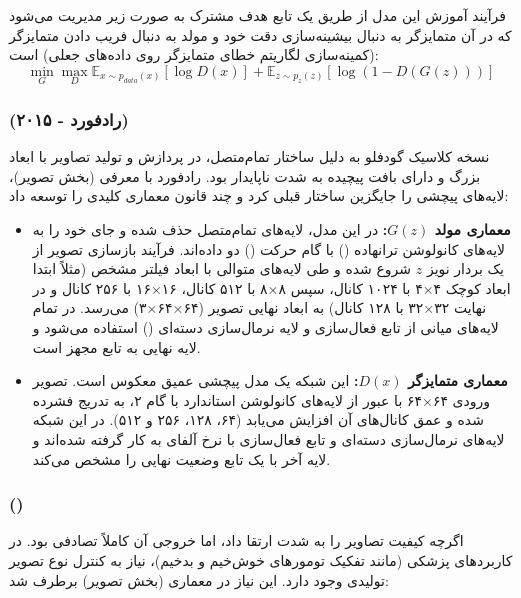 \documentclass{article}
\begin{document}
فرآیند آموزش این مدل از طریق یک تابع هدف مشترک به صورت زیر مدیریت می‌شود که در آن متمایزگر به دنبال بیشینه‌سازی دقت خود و مولد به دنبال فریب دادن متمایزگر (کمینه‌سازی لگاریتم خطای متمایزگر روی داده‌های جعلی) است:
$$\min_{G} \max_{D} \mathbb{E}_{x \sim p_{data}(x)}[\log D(x)] + \mathbb{E}_{z \sim p_z(z)}[\log (1 - D(G(z)))]$$

\subsubsection*{ (رادفورد - ۲۰۱۵)}
نسخه کلاسیک گودفلو به دلیل ساختار تمام‌متصل، در پردازش و تولید تصاویر با ابعاد بزرگ و دارای بافت پیچیده به شدت ناپایدار بود. رادفورد با معرفی  (بخش  تصویر)، لایه‌های پیچشی را جایگزین ساختار قبلی کرد و چند قانون معماری کلیدی را توسعه داد:

\begin{itemize}
	\item \textbf{معماری مولد $G(z)$:} در این مدل، لایه‌های تمام‌متصل حذف شده و جای خود را به لایه‌های کانولوشن ترانهاده () با گام حرکت () دو داده‌اند. فرآیند بازسازی تصویر از یک بردار نویز $z$ شروع شده و طی لایه‌های متوالی با ابعاد فیلتر مشخص (مثلاً ابتدا ابعاد کوچک ۴×۴ با ۱۰۲۴ کانال، سپس ۸×۸ با ۵۱۲ کانال، ۱۶×۱۶ با ۲۵۶ کانال و در نهایت ۳۲×۳۲ با ۱۲۸ کانال) به ابعاد نهایی تصویر (۶۴×۶۴×۳) می‌رسد. در تمام لایه‌های میانی از تابع فعال‌سازی  و لایه نرمال‌سازی دسته‌ای () استفاده می‌شود و لایه نهایی به تابع  مجهز است.
	\item \textbf{معماری متمایزگر $D(x)$:} این شبکه یک مدل پیچشی عمیق معکوس است. تصویر ورودی ۶۴×۶۴ با عبور از لایه‌های کانولوشن استاندارد با گام ۲، به تدریج فشرده شده و عمق کانال‌های آن افزایش می‌یابد (۶۴، ۱۲۸، ۲۵۶ و ۵۱۲). در این شبکه لایه‌های نرمال‌سازی دسته‌ای و تابع فعال‌سازی  با نرخ آلفای  به کار گرفته شده‌اند و لایه آخر با یک تابع  وضعیت نهایی را مشخص می‌کند.
\end{itemize}

\subsubsection*{ ()}
اگرچه  کیفیت تصاویر را به شدت ارتقا داد، اما خروجی آن کاملاً تصادفی بود. در کاربردهای پزشکی (مانند تفکیک تومورهای خوش‌خیم و بدخیم)، نیاز به کنترل نوع تصویر تولیدی وجود دارد. این نیاز در معماری  (بخش  تصویر) برطرف شد:
\end{document}
